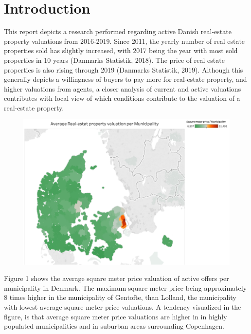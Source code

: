 \documentclass[12pt,a4paper]{article}
\begin{document}

\newpage
\onehalfspacing

\tableofcontents
\newpage
\section{Introduction}
This report depicts a research performed regarding active Danish real-estate property valuations from 2016-2019. Since 2011, the yearly number of real estate properties sold has slightly increased, with 2017 being the year with most sold properties in 10 years (Danmarks Statistik, 2018).  The price of real estate properties is also rising through 2019 (Danmarks Statistik, 2019). Although this generally depicts a willingness of buyers to pay more for real-estate property, and higher valuations from agents, a closer analysis of current and active valuations contributes with local view of which conditions contribute to the valuation of a real-estate property. \newline
\begin{figure}[H]
\centering
\caption{}
\includegraphics[scale=1]{123.png}
\end{figure}

Figure 1 shows the average square meter price valuation of active offers per municipality in Denmark. The maximum square meter price being approximately 8 times higher in the municipality of Gentofte, than Lolland, the municipality with lowest average square meter price valuations. A tendency visualized in the figure, is that average square meter price valuations are higher in in highly populated municipalities and in suburban areas surrounding Copenhagen. \newline
\end{document}
